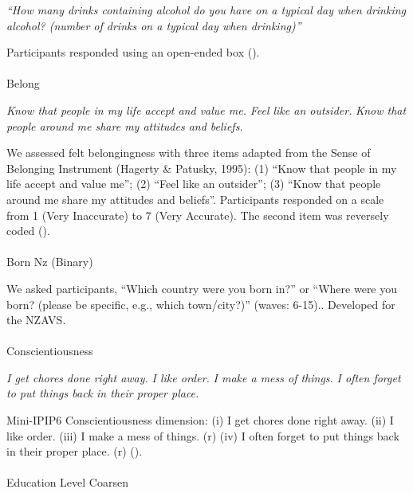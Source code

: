 \documentclass[
  single column]{article}
\makeatletter
\let\oldparagraph\paragraph
\renewcommand{\paragraph}{
    \@ifstar
      \xxxParagraphStar
      \xxxParagraphNoStar
  }
\newcommand{\xxxParagraphStar}[1]{\oldparagraph*{#1}\mbox{}}
\newcommand{\xxxParagraphNoStar}[1]{\oldparagraph{#1}\mbox{}}
\makeatother
\begin{document}
\emph{``How many drinks containing alcohol do you have on a typical day
when drinking alcohol? (number of drinks on a typical day when
drinking)''}

Participants responded using an open-ended box
().

\paragraph{Belong}\label{belong}

\emph{Know that people in my life accept and value me.} \emph{Feel like
an outsider.} \emph{Know that people around me share my attitudes and
beliefs.}

We assessed felt belongingness with three items adapted from the Sense
of Belonging Instrument (Hagerty \& Patusky, 1995): (1) ``Know that
people in my life accept and value me''; (2) ``Feel like an outsider'';
(3) ``Know that people around me share my attitudes and beliefs''.
Participants responded on a scale from 1 (Very Inaccurate) to 7 (Very
Accurate). The second item was reversely coded
().

\paragraph{Born Nz (Binary)}\label{born-nz-binary}

We asked participants, ``Which country were you born in?'' or ``Where
were you born? (please be specific, e.g., which town/city?)'' (waves:
6-15).. Developed for the NZAVS.

\paragraph{Conscientiousness}\label{conscientiousness}

\emph{I get chores done right away.} \emph{I like order.} \emph{I make a
mess of things.} \emph{I often forget to put things back in their proper
place.}

Mini-IPIP6 Conscientiousness dimension: (i) I get chores done right
away. (ii) I like order. (iii) I make a mess of things. (r) (iv) I often
forget to put things back in their proper place. (r)
().

\paragraph{Education Level Coarsen}\label{education-level-coarsen}
\end{document}
